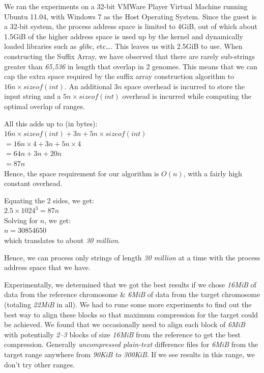 \documentclass[11pt]{article}
\begin{document}
We ran the experiments on a 32-bit VMWare Player Virtual Machine
running Ubuntu 11.04, with Windows 7 as the Host Operating
System. Since the guest is a 32-bit system, the process address space
is limited to 4GiB, out of which about 1.5GiB of the higher address
space is used up by the kernel and dynamically loaded libraries such
as \textit{glibc}, etc\ldots{}. This leaves us with 2.5GiB to
use. When constructing the Suffix Array, we have observed that there
are rarely sub-strings greater than \textit{65,536} in length that
overlap in 2 genomes. This means that we can cap the extra space
required by the suffix array construction algorithm to $16n \times
sizeof(int)$. An additional $3n$ space overhead is incurred to store
the input string and a $5n \times sizeof(int)$ overhead is incurred
while computing the optimal overlap of ranges.

All this adds up to (in bytes):\\
$16n \times sizeof(int) + 3n + 5n \times sizeof(int)$\\
$= 16n \times 4 + 3n + 5n \times 4$\\
$= 64n + 3n + 20n$\\
$= 87n$\\

Hence, the space requirement for our algorithm is $O(n)$, with a
fairly high constant overhead.

Equating the 2 sides, we get:\\
$2.5 \times 1024^3 = 87n$\\
Solving for $n$, we get:\\
$n = 30854650$\\
which translates to about \textit{30 million}.

Hence, we can process only strings of length \textit{30 million} at a
time with the process address space that we have.

Experimentally, we determined that we got the best results if we chose
\textit{16MiB} of data from the reference chromosome \& \textit{6MiB}
of data from the target chromosome (totaling \textit{22MiB} in
all). We had to rune some more experiments to find out the best way to
align these blocks so that maximum compression for the target could be
achieved. We found that we occasionally need to align each block of
\textit{6MiB} with potentially \textit{2--3} blocks of size
\textit{16MiB} from the reference to get the best
compression. Generally \textit{uncompressed plain-text} difference
files for \textit{6MiB} from the target range anywhere from
{\textit{90KiB to 300KiB}}. If we see results in this range, we don't
try other ranges.
\end{document}

